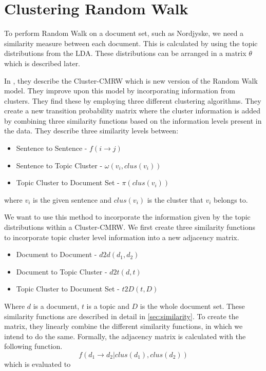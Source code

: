 \section{Clustering Random Walk}
To perform Random Walk on a document set, such as Nordjyske, we need a similarity measure between each document.
This is calculated by using the topic distributions from the \gls{LDA}.
These distributions can be arranged in a matrix $\theta$ which is described later.

In \cite{ClusterPageRank}, they describe the \gls{Cluster-CMRW} which is new version of the Random Walk model. They improve upon this model by incorporating information from clusters. 
They find these by employing three different clustering algorithms.
They create a new transition probability matrix where the cluster information is added by combining three similarity functions based on the information levels present in the data.
They describe three similarity levels between:
\begin{itemize}
    \item Sentence to Sentence - $f(i \rightarrow j)$
    \item Sentence to Topic Cluster - $\omega(v_i, clus(v_i))$
    \item Topic Cluster to Document Set - $\pi(clus(v_i))$
\end{itemize}
where $v_i$ is the given sentence and $clus(v_i)$ is the cluster that $v_i$ belongs to.

We want to use this method to incorporate the information given by the topic distributions within a \gls{Cluster-CMRW}. 
We first create three similarity functions to incorporate topic cluster level information into a new adjacency matrix.
\begin{itemize}
    \item Document to Document - $d2d(d_1, d_2)$
    \item Document to Topic Cluster - $d2t(d,t)$
    \item Topic Cluster to Document Set - $t2D(t, D)$
\end{itemize}

\noindent
Where $d$ is a document, $t$ is a topic and $D$ is the whole document set.
These similarity functions are described in detail in \autoref{sec:similarity}.
To create the matrix, they linearly combine the different similarity functions, in which we intend to do the same.
Formally, the adjacency matrix is calculated with the following function.
$$ f(d_1 \rightarrow d_2 | clus(d_1), clus(d_2)) $$
which is evaluated to 

